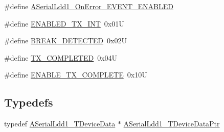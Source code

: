 \begin{DoxyCompactItemize}
\item 
\#define \hyperlink{group___a_serial_ldd1__module_gab39b2ceda501dc0190b56ef407291fc5}{A\+Serial\+Ldd1\+\_\+\+On\+Error\+\_\+\+E\+V\+E\+N\+T\+\_\+\+E\+N\+A\+B\+L\+ED}
\item 
\#define \hyperlink{group___a_serial_ldd1__module_gab05896dbf11eed7f4078978e7287669d}{E\+N\+A\+B\+L\+E\+D\+\_\+\+T\+X\+\_\+\+I\+NT}~0x01U
\item 
\#define \hyperlink{group___a_serial_ldd1__module_ga617e6f524bf659f58012c8f0248004e5}{B\+R\+E\+A\+K\+\_\+\+D\+E\+T\+E\+C\+T\+ED}~0x02U
\item 
\#define \hyperlink{group___a_serial_ldd1__module_ga1f79d891cf81d9f65cccd3a0ab84b1ee}{T\+X\+\_\+\+C\+O\+M\+P\+L\+E\+T\+ED}~0x04U
\item 
\#define \hyperlink{group___a_serial_ldd1__module_gac0fc7ebba74ca47c17389980225ddf48}{E\+N\+A\+B\+L\+E\+\_\+\+T\+X\+\_\+\+C\+O\+M\+P\+L\+E\+TE}~0x10U
\end{DoxyCompactItemize}
\subsection*{Typedefs}
\begin{DoxyCompactItemize}
\item 
typedef \hyperlink{struct_a_serial_ldd1___t_device_data}{A\+Serial\+Ldd1\+\_\+\+T\+Device\+Data} $\ast$ \hyperlink{group___a_serial_ldd1__module_ga3d5a6f8c983c88c4447d8c30465a7d12}{A\+Serial\+Ldd1\+\_\+\+T\+Device\+Data\+Ptr}
\end{DoxyCompactItemize}
